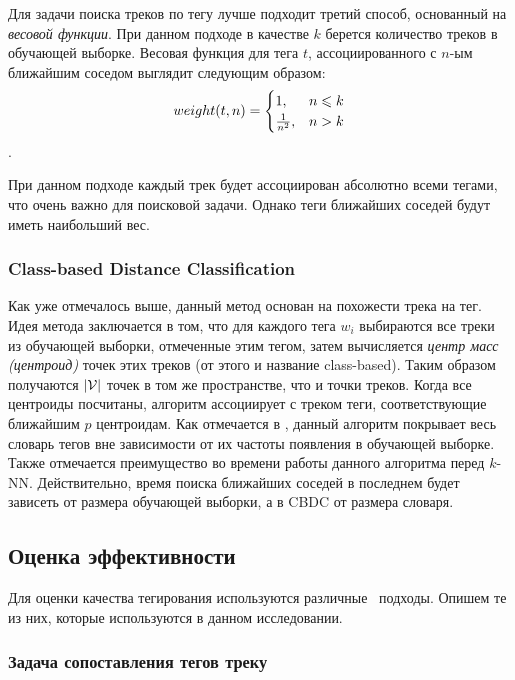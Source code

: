 Для задачи поиска треков по тегу лучше подходит третий способ, основанный на \emph{весовой функции}. При данном подходе в качестве $k$ берется количество треков в обучающей выборке.
Весовая функция для тега $t$, ассоциированного с $n$-ым ближайшим соседом выглядит следующим образом:
$$\begin{equation}
weight(t, n) = 
 \begin{cases}
   1, & n \leqslant k \\
   \frac{1}{n^2}, & n > k
 \end{cases}
\end{equation}$$.

При данном подходе каждый трек будет ассоциирован абсолютно всеми тегами, что очень важно для поисковой задачи. Однако теги ближайших соседей будут иметь наибольший вес.

\subsubsection{Class-based Distance Classification}

Как уже отмечалось выше, данный метод основан на похожести трека на тег. Идея метода заключается в том, что для каждого тега $w_i$ выбираются все треки из обучающей выборки, 
отмеченные этим тегом, затем вычисляется \emph{центр масс (центроид)} точек этих треков (от этого и название class-based). Таким образом получаются $|\mathcal{V}|$ точек в том же 
пространстве, что и точки треков. Когда все центроиды посчитаны, алгоритм ассоциирует с треком теги, соответствующие ближайшим $p$ центроидам.
Как отмечается в \cite{msordo_thesis}, данный алгоритм покрывает весь словарь тегов вне зависимости от их частоты появления в обучающей выборке. Также отмечается преимущество во времени работы
данного алгоритма перед $k$-NN. Действительно, время поиска ближайших соседей в последнем будет зависеть от размера обучающей выборки, а в CBDC \ld от размера словаря. 

\subsection{Оценка эффективности}

Для оценки качества тегирования используются различные~\cite{msordo_thesis, prec_recall, turnbull} подходы. Опишем те из них, которые используются в данном исследовании.

\subsubsection{Задача сопоставления тегов треку}

